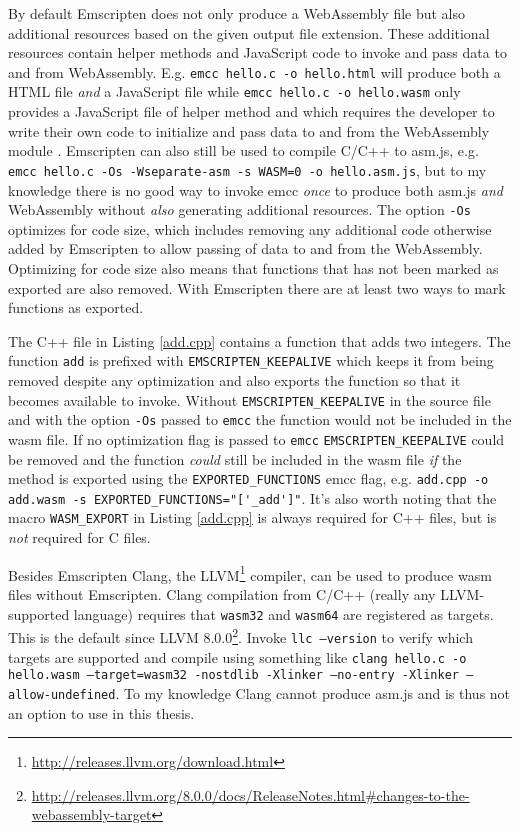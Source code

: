 By default Emscripten does not only produce a WebAssembly file but also additional resources based on the given output file extension. These additional resources contain helper methods and JavaScript code to invoke and pass data to and from WebAssembly. E.g. \verb|emcc hello.c -o hello.html| will produce both a HTML file \emph{and} a JavaScript file while \verb|emcc hello.c -o hello.wasm| only provides a JavaScript file of helper method and which requires the developer to write their own code to initialize and pass data to and from the WebAssembly module \parencite{Rourke2018}. Emscripten can also still be used to compile C/C++ to asm.js, e.g. \texttt{emcc hello.c -Os -Wseparate-asm -s WASM=0 -o hello.asm.js}, but to my knowledge there is no good way to invoke emcc \emph{once} to produce both asm.js \emph{and} WebAssembly without \emph{also} generating additional resources. The option \texttt{-Os} optimizes for code size, which includes removing any additional code otherwise added by Emscripten to allow passing of data to and from the WebAssembly. Optimizing for code size also means that functions that has not been marked as exported are also removed. With Emscripten there are at least two ways to mark functions as exported. 



The C++ file in Listing \ref{add.cpp} contains a function that adds two integers. The function \texttt{add} is prefixed with \verb|EMSCRIPTEN_KEEPALIVE| which keeps it from being removed despite any optimization and also exports the function so that it becomes available to invoke. Without \verb|EMSCRIPTEN_KEEPALIVE| in the source file and with the option \texttt{-Os} passed to \texttt{emcc} the function would not be included in the wasm file. If no optimization flag is passed to \texttt{emcc} \verb|EMSCRIPTEN_KEEPALIVE| could be removed and the function \emph{could} still be included in the wasm file \emph{if} the method is exported using the \verb|EXPORTED_FUNCTIONS| emcc flag, e.g. \verb|add.cpp -o add.wasm -s EXPORTED_FUNCTIONS="['_add']"|. It's also worth noting that the macro \verb|WASM_EXPORT| in Listing \ref{add.cpp} is always required for C++ files, but is \emph{not} required for C files.


Besides Emscripten Clang, the LLVM\footnote{\url{http://releases.llvm.org/download.html}} compiler, can be used to produce wasm files without Emscripten. Clang compilation from C/C++ (really any LLVM-supported language) requires that \texttt{wasm32} and \texttt{wasm64} are registered as targets. This is the default since LLVM 8.0.0\footnote{\url{http://releases.llvm.org/8.0.0/docs/ReleaseNotes.html\#changes-to-the-webassembly-target}}. Invoke \texttt{llc --version} to verify which targets are supported and compile using something like \texttt{clang hello.c -o hello.wasm --target=wasm32 -nostdlib -Xlinker --no-entry -Xlinker --allow-undefined}. To my knowledge Clang cannot produce asm.js and is thus not an option to use in this thesis.

